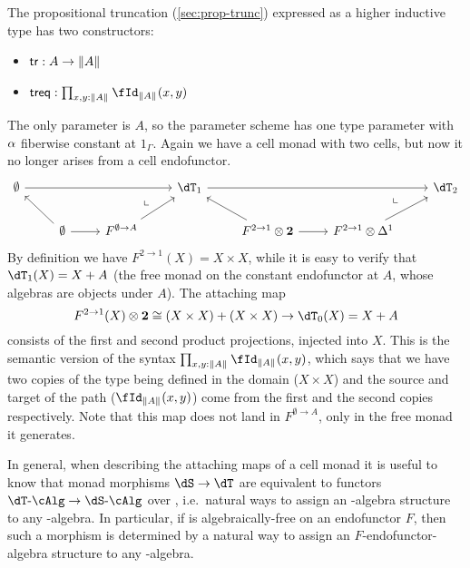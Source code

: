 \documentclass[referee]{psp}
\def\alg{\text{-}\cAlg}
\def\tr{\mathsf{tr}}
\def\treq{\mathsf{treq}}
\begin{document}
\begin{eg} \label{eg:prop-trunc}
  The propositional truncation (\cref{sec:prop-trunc}) expressed as a higher inductive type has two constructors:
  \begin{itemize}
  \item $\tr:A \to\brck{A}$
  \item $\treq : \prod_{x,y:\brck A} \id[\brck A]{x}{y}$
  \end{itemize}
  The only parameter is $A$, so the parameter scheme has one type parameter with $\alpha$ fiberwise constant at $1_\Gamma$.
  Again we have a cell monad with two cells, but now it no longer arises from a cell endofunctor.
  \[
  \begin{tikzcd}
    \emptyset \ar[rrr] &&& \dT_1 \ar[rrr] &&& \dT_2 \\
    & \emptyset \ar[ul] \ar[r] \ar[urr,phantom,near end,"\llcorner"] & F^{\emptyset\to A} \ar[ur] &
    & F^{2\to 1} \otimes \mathbf{2} \ar[ul] \ar[r] \ar[urr,phantom,near end,"\llcorner"] & F^{2\to 1} \otimes \ivl \ar[ur]
  \end{tikzcd}
  \]
  By definition we have $F^{2\to 1}(X) = X\times X$, while it is easy to verify that $\dT_1(X) = X+A$ (the free monad on the constant endofunctor at $A$, whose algebras are objects under $A$).
  The attaching map
  \[F^{2\to 1}(X)\otimes \mathbf{2} \cong (X\times X) + (X\times X) \to \dT_0(X) = X+A\]
  consists of the first and second product projections, injected into $X$.
  This is the semantic version of the syntax $\prod_{x,y:\brck A} \id[\brck A]{x}{y}$, which says that we have two copies of the type being defined in the domain ($X\times X$) and the source and target of the path ($\id[\brck A]{x}{y}$) come from the first and the second copies respectively.
  Note that this map does not land in $F^{\emptyset\to A}$, only in the free monad it generates.
\end{eg}

In general, when describing the attaching maps of a cell monad it is useful to know that monad morphisms $\dS\to\dT$ are equivalent to functors $\dT\alg\to\dS\alg$ over \sM, i.e.\ natural ways to assign an \dS-algebra structure to any \dT-algebra.
In particular, if \dS is algebraically-free on an endofunctor $F$, then such a morphism is determined by a natural way to assign an $F$-endofunctor-algebra structure to any \dT-algebra.
\end{document}
